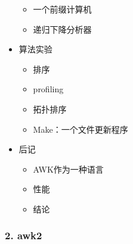 \documentclass[bigger]{beamer}
\begin{document}
\begin{frame}[fragile]
\begin{itemize}
\begin{itemize}
\item 一个前缀计算机
\label{sec-5-1-7-5}%

\item 递归下降分析器
\label{sec-5-1-7-6}%
\end{itemize} %

\item 算法实验
\label{sec-5-1-8}%
\begin{itemize}

\item 排序
\label{sec-5-1-8-1}%

\item profiling
\label{sec-5-1-8-2}%

\item 拓扑排序
\label{sec-5-1-8-3}%

\item Make：一个文件更新程序
\label{sec-5-1-8-4}%
\end{itemize} %

\item 后记
\label{sec-5-1-9}%
\begin{itemize}

\item AWK作为一种语言
\label{sec-5-1-9-1}%

\item 性能
\label{sec-5-1-9-2}%

\item 结论
\label{sec-5-1-9-3}%
\end{itemize} %
\end{itemize} %
\end{frame}
\begin{frame}
\frametitle{2. awk2}
\label{sec-5-2}
\end{frame}
\end{document}
